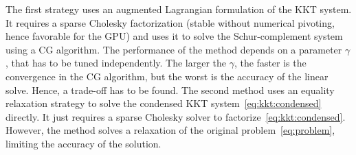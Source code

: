 The first strategy uses an augmented Lagrangian formulation
of the KKT system. It requires a sparse Cholesky factorization (stable without numerical
pivoting, hence favorable for the GPU) and uses it to solve the Schur-complement system
using a CG algorithm. The performance of the method depends on a parameter $\gamma$, that
has to be tuned independently. The larger the $\gamma$, the faster is the convergence
in the CG algorithm, but the worst is the accuracy of the linear solve. Hence, a trade-off
has to be found. The second method uses an equality relaxation strategy to
solve the condensed KKT system~\eqref{eq:kkt:condensed} directly. It just requires
a sparse Cholesky solver to factorize~\eqref{eq:kkt:condensed}. However, the method
solves a relaxation of the original problem~\eqref{eq:problem}, limiting the accuracy
of the solution.


